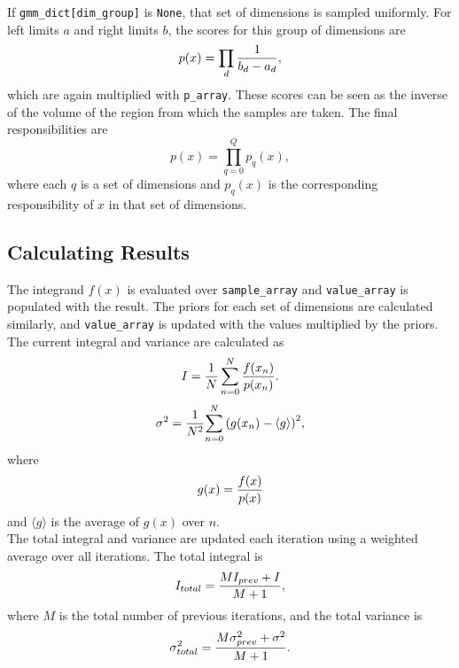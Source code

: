\documentclass{article}
\begin{document}
If \texttt{gmm\_dict[dim\_group]} is \texttt{None}, that set of dimensions is
sampled uniformly. For left limits $a$ and right limits $b$, the scores for this
group of dimensions are
\begin{equation}
    p(x) = \prod_{d} {1 \over {b_d - a_d}},
\end{equation}
which are again multiplied with \texttt{p\_array}. These scores can be seen as
the inverse of the volume of the region from which the samples are taken. The
final responsibilities are
\begin{equation}
    p(x) = \prod_{q=0}^{Q} p_q(x),
\end{equation}
where each $q$ is a set of dimensions and $p_q(x)$ is the corresponding
responsibility of $x$ in that set of dimensions.

\subsection{Calculating Results}

The integrand $f(x)$ is evaluated over \texttt{sample\_array} and \texttt{value\_array}
is populated with the result. The priors for each set of dimensions are calculated
similarly, and \texttt{value\_array} is updated with the values multiplied by the priors. \\

The current integral and variance are calculated as
\begin{equation}
    I = {{1 \over N} \sum_{n=0}^{N} {f(x_n) \over {p(x_n)}}}.
\end{equation}
\begin{equation}
    \sigma^2 = {1 \over N^2}{\sum\limits_{n=0}^{N} {(g(x_n) - \langle g \rangle)}^2},
\end{equation}
where
\begin{equation}
    g(x) = {f(x) \over {p(x)}}
\end{equation}
and $\langle g \rangle$ is the average of $g(x)$ over $n$. \\

The total integral and variance are updated each iteration using a weighted average
over all iterations. The total integral is
\begin{equation}
    I_{total} = {{M I_{prev} + I} \over {M + 1}},
\end{equation}
where $M$ is the total number of previous iterations, and the total variance is
\begin{equation}
    \sigma^2_{total} = {{M \sigma^2_{prev} + \sigma^2} \over {M + 1}}.
\end{equation}
\end{document}
